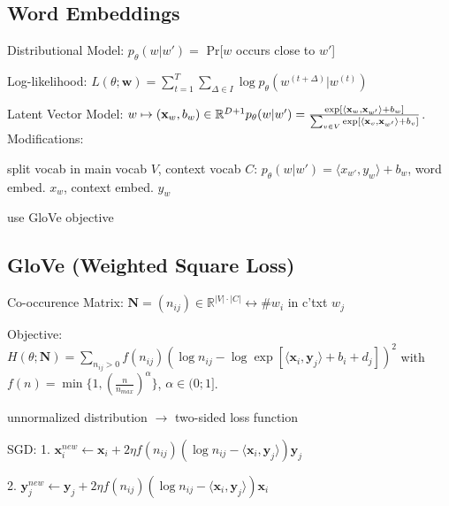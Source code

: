 \documentclass[a4paper, 11pt, landscape]{article}
\begin{document}
\begin{multicols*}{3}
\section{Word Embeddings}
\begin{compactdesc}
  \item[Distributional Model:] $p_\theta(w|w') = $ Pr[$w$ occurs close to $w'$]
  \item[Log-likelihood:] $L(\theta; \mathbf{w}) = \sum_{t=1}^T\sum_{\Delta \in I}{\log p_\theta(w^{(t+\Delta)}|w^{(t)})}$
  \item[Latent Vector Model:] $w \mapsto (\mathbf{x}_w, b_w) \in \mathbb{R}^{D+1} \\p_{\theta}(w|w') = \frac{\exp[\langle \mathbf{x}_w,\mathbf{x}_{w'}\rangle + b_w]}{\sum_{v\in V}{\exp[\langle \mathbf{x}_v,\mathbf{x}_{w'}\rangle + b_v ]}}$.
  Modifications:
  \begin{inparaitem}[\color{red}\textbullet]
  \item split vocab in main vocab $V$, context vocab $C$: $p_{\theta}(w|w') = \langle x_{w'}, y_{w} \rangle + b_w$, word embed. $x_w$, context embed. $y_w$
  \item use GloVe objective
  \end{inparaitem}
\end{compactdesc}

\subsection{GloVe (Weighted Square Loss)}
\begin{compactdesc}
  \item[Co-occurence Matrix:]$\mathbf{N} = (n_{ij}) \in \mathbb{R}^{|V|\cdot |C|} \leftrightarrow \# w_i$ in c'txt $w_j$
  \item[Objective:] $H(\theta;\mathbf{N}) = \sum_{n_{ij} > 0} f(n_{ij})(\log n_{ij} - \log \exp[\langle \mathbf{x}_i, \mathbf{y}_j \rangle + b_i + d_j])^2$ with $f(n) = \min\{1, (\frac{n}{n_{max}})^\alpha\}$, $\alpha \in (0;1]$.
\end{compactdesc}
unnormalized distribution $\rightarrow$ two-sided loss function
\begin{compactdesc}
  \item[SGD:] 1. $\mathbf{x}_i^{new} \leftarrow \mathbf{x}_i + 2\eta f(n_{ij})(\log n_{ij} - \langle \mathbf{x}_i, \mathbf{y}_j \rangle)\mathbf{y}_j$ 
  \item \hspace{26pt}2. $\mathbf{y}_j^{new} \leftarrow \mathbf{y}_j + 2\eta f(n_{ij})(\log n_{ij} - \langle \mathbf{x}_i, \mathbf{y}_j \rangle)\mathbf{x}_i$
\end{compactdesc}


\end{multicols*}
\end{document}

